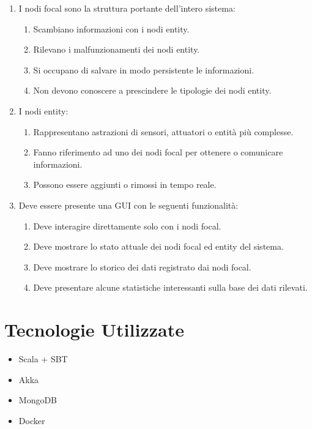 \documentclass[12pt,a4paper,openright,twoside]{book}
\begin{document}
\begin{enumerate}
    \item I nodi focal sono la struttura portante dell'intero sistema:
    \begin{enumerate}
        \item Scambiano informazioni con i nodi entity.
        \item Rilevano i malfunzionamenti dei nodi entity.
        \item Si occupano di salvare in modo persistente le informazioni.
        \item Non devono conoscere a prescindere le tipologie dei nodi entity.
    \end{enumerate}
    \item I nodi entity:
    \begin{enumerate}
        \item Rappresentano astrazioni di sensori, attuatori o entità più complesse.
        \item Fanno riferimento ad uno dei nodi focal per ottenere o comunicare informazioni.
        \item Possono essere aggiunti o rimossi in tempo reale.
    \end{enumerate}
    \item Deve essere presente una GUI con le seguenti funzionalità:
    \begin{enumerate}
        \item Deve interagire direttamente solo con i nodi focal.
        \item Deve mostrare lo stato attuale dei nodi focal ed entity del sistema.
        \item Deve mostrare lo storico dei dati registrato dai nodi focal.
        \item Deve presentare alcune statistiche interessanti sulla base dei dati rilevati.
    \end{enumerate}
\end{enumerate}

\section{Tecnologie Utilizzate}

\begin{itemize}
    \item Scala + SBT
    \item Akka
    \item MongoDB
    \item Docker
\end{itemize}
\end{document}
